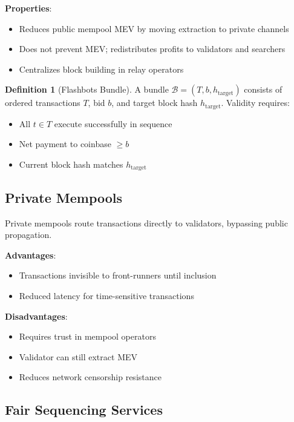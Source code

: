 \documentclass[11pt,a4paper]{article}
\theoremstyle{definition}
\newtheorem{definition}{Definition}
\begin{document}
\textbf{Properties}:
\begin{itemize}
    \item Reduces public mempool MEV by moving extraction to private channels
    \item Does not prevent MEV; redistributes profits to validators and searchers
    \item Centralizes block building in relay operators
\end{itemize}

\begin{definition}[Flashbots Bundle]
A bundle $\mathcal{B} = (T, b, h_{\text{target}})$ consists of ordered transactions $T$, bid $b$, and target block hash $h_{\text{target}}$. Validity requires:
\begin{itemize}
    \item All $t \in T$ execute successfully in sequence
    \item Net payment to coinbase $\geq b$
    \item Current block hash matches $h_{\text{target}}$
\end{itemize}
\end{definition}

\subsection{Private Mempools}

Private mempools route transactions directly to validators, bypassing public propagation.

\textbf{Advantages}:
\begin{itemize}
    \item Transactions invisible to front-runners until inclusion
    \item Reduced latency for time-sensitive transactions
\end{itemize}

\textbf{Disadvantages}:
\begin{itemize}
    \item Requires trust in mempool operators
    \item Validator can still extract MEV
    \item Reduces network censorship resistance
\end{itemize}

\subsection{Fair Sequencing Services}
\end{document}
